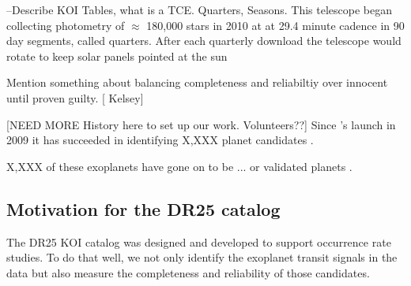 --Describe KOI Tables, what is a TCE.  Quarters, Seasons.
This telescope began collecting photometry of $\approx$ 180,000 stars in 2010 at at 29.4 minute cadence in 90 day segments, called quarters. After each quarterly download the telescope would rotate to keep solar panels pointed at the sun

Mention something about balancing completeness and reliabiltiy over innocent until proven guilty. [ Kelsey]

[NEED MORE History here to set up our work. Volunteers??]
Since \Kepler's launch in 2009 it has succeeded in identifying X,XXX planet candidates \citep{Borucki2010a,Coughlin2016}. 

X,XXX of these exoplanets have gone on to be ... or validated planets \citep[see most recently][]{Morton2016}.  %



\subsection{Motivation for the DR25 catalog}

The DR25 KOI catalog was designed and developed to support occurrence rate studies. To do that well, we not only identify the exoplanet transit signals in the data but also measure the completeness and reliability of those candidates. 


